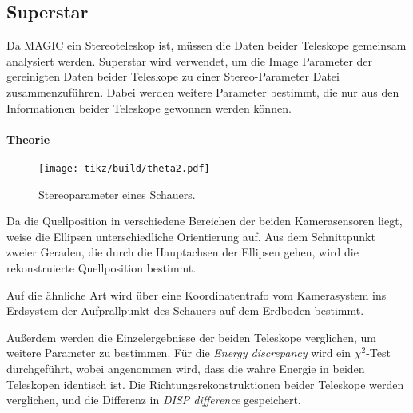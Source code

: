 \subsection{Superstar}%
\label{sub:superstar}

Da MAGIC ein Stereoteleskop ist,
müssen die Daten beider Teleskope gemeinsam analysiert werden.
Superstar wird verwendet,
um die Image Parameter der gereinigten Daten beider
Teleskope zu einer Stereo-Parameter Datei zusammenzuführen.
Dabei werden weitere Parameter bestimmt,
die nur aus den Informationen beider Teleskope gewonnen werden können.

\paragraph{Theorie}%

\begin{wrapfigure}[12]{O}{0.4\textwidth}
  \centering
  \texttt{[image: tikz/build/theta2.pdf]}
  \caption{Stereoparameter eines Schauers.}%
  \label{fig:reco}
\end{wrapfigure}

Da die Quellposition in verschiedene Bereichen der beiden Kamerasensoren
liegt,
weise die Ellipsen unterschiedliche Orientierung auf.
Aus dem Schnittpunkt zweier Geraden,
die durch die Hauptachsen der Ellipsen gehen,
wird die rekonstruierte Quellposition bestimmt.

Auf die ähnliche Art wird über eine Koordinatentrafo vom Kamerasystem ins
Erdsystem der Aufprallpunkt des Schauers auf dem Erdboden
bestimmt.


Außerdem werden die Einzelergebnisse der beiden Teleskope verglichen,
um weitere Parameter zu bestimmen.
Für die \textit{Energy discrepancy} wird
ein $\chi^2$-Test durchgeführt,
wobei angenommen wird,
dass die wahre Energie in beiden Teleskopen identisch ist.
Die Richtungsrekonstruktionen beider Teleskope werden verglichen,
und die Differenz in \textit{DISP difference} gespeichert.
